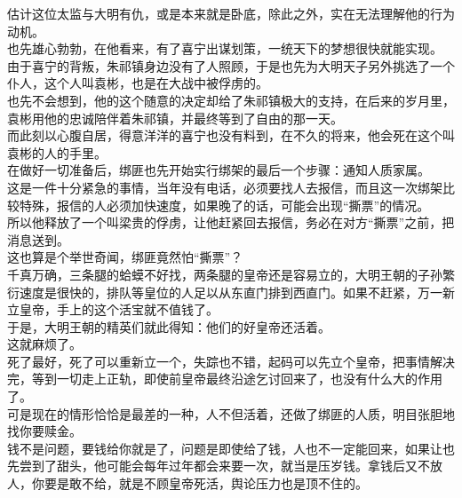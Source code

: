 \begin{multicols}{\theparacolNo}
估计这位太监与大明有仇，或是本来就是卧底，除此之外，实在无法理解他的行为动机。\\

也先雄心勃勃，在他看来，有了喜宁出谋划策，一统天下的梦想很快就能实现。\\

由于喜宁的背叛，朱祁镇身边没有了人照顾，于是也先为大明天子另外挑选了一个仆人，这个人叫袁彬，也是在大战中被俘虏的。\\

也先不会想到，他的这个随意的决定却给了朱祁镇极大的支持，在后来的岁月里，袁彬用他的忠诚陪伴着朱祁镇，并最终等到了自由的那一天。\\

而此刻以心腹自居，得意洋洋的喜宁也没有料到，在不久的将来，他会死在这个叫袁彬的人的手里。\\

在做好一切准备后，绑匪也先开始实行绑架的最后一个步骤：通知人质家属。\\

这是一件十分紧急的事情，当年没有电话，必须要找人去报信，而且这一次绑架比较特殊，报信的人必须加快速度，如果晚了的话，可能会出现“撕票”的情况。\\

所以他释放了一个叫梁贵的俘虏，让他赶紧回去报信，务必在对方“撕票”之前，把消息送到。\\

这也算是个举世奇闻，绑匪竟然怕“撕票”？\\

千真万确，三条腿的蛤蟆不好找，两条腿的皇帝还是容易立的，大明王朝的子孙繁衍速度是很快的，排队等皇位的人足以从东直门排到西直门。如果不赶紧，万一新立皇帝，手上的这个活宝就不值钱了。\\

于是，大明王朝的精英们就此得知：他们的好皇帝还活着。\\

这就麻烦了。\\

死了最好，死了可以重新立一个，失踪也不错，起码可以先立个皇帝，把事情解决完，等到一切走上正轨，即使前皇帝最终沿途乞讨回来了，也没有什么大的作用了。\\

可是现在的情形恰恰是最差的一种，人不但活着，还做了绑匪的人质，明目张胆地找你要赎金。\\

钱不是问题，要钱给你就是了，问题是即使给了钱，人也不一定能回来，如果让也先尝到了甜头，他可能会每年过年都会来要一次，就当是压岁钱。拿钱后又不放人，你要是敢不给，就是不顾皇帝死活，舆论压力也是顶不住的。\\


\end{multicols}
